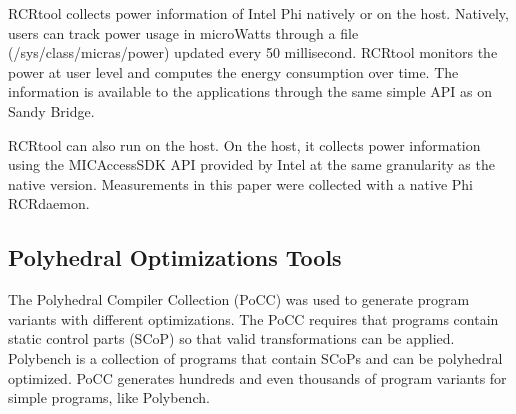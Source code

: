 RCRtool collects power information of Intel Phi natively
or on the host. Natively, users can track power usage in microWatts through    
a file (/sys/class/micras/power) updated every 50 millisecond.
RCRtool monitors the power at user level and computes the energy
consumption over time.
The information is available to the applications through the same simple API as on
Sandy Bridge.

RCRtool can also run on the host. On the host, it collects
power information using the MICAccessSDK API provided by Intel at the same 
granularity as the native version. 
Measurements in this paper were collected with a native Phi RCRdaemon.
 
\subsection{Polyhedral Optimizations Tools}
The Polyhedral Compiler Collection (PoCC)\cite{PoCC} was used to generate program 
variants with different optimizations.
The PoCC requires that programs contain static control parts (SCoP)\cite{SCoP1,SCoP2} so that 
valid transformations can be applied. Polybench is a collection of programs
that contain SCoPs and can be polyhedral optimized.  
PoCC generates hundreds and even thousands of program variants for simple programs, like Polybench.
